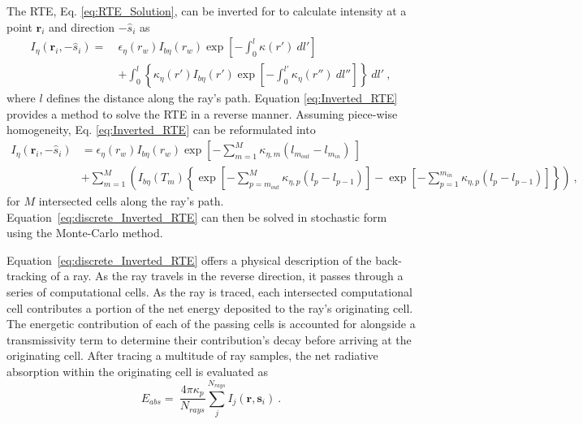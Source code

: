 The RTE, Eq. \ref{eq:RTE_Solution}, can be inverted for to calculate intensity at a point $\textbf{r}_i$ and direction $-\hat{s}_i$ as
\begin{equation}
    \begin{aligned}
    I_\eta{}(\textbf{r}_i,-\hat{s}_i) =~&\epsilon{}_\eta{}(r_w)I_{b\eta{}}(r_w)\exp{\left[-\int_0^l\kappa{}(r')~dl'\right]}\\
    &+\int_{0}^{l}{ \left\{ \kappa_\eta(r')I_{b\eta}(r')\exp{\left[-\int_0^{l'}\kappa_\eta(r'')~dl''\right]} \right\}}~dl'~,
    \label{eq:Inverted_RTE}
    \end{aligned}
\end{equation}
where $l$ defines the distance along the ray's path. Equation \ref{eq:Inverted_RTE} provides a method to solve the RTE in a reverse manner.
Assuming piece-wise homogeneity, Eq. \ref{eq:Inverted_RTE} can be reformulated into
\begin{equation}
    \begin{aligned}
    I_\eta{}(\textbf{r}_i,-\hat{s}_i)& = \epsilon{}_\eta{}(r_w)I_{b\eta{}}(r_w)\exp{\left[-\sum_{m=1}^M\kappa{}_{\eta{},m}(l_{m_{out}}-l_{m_{in}})~\right]}\\
    &+\sum_{m=1}^M\left( I_{b\eta}(T_m)\left\{ \exp{\left[-\sum_{p=m_{out}}^M\kappa{}_{\eta{},p}(l_{p}-l_{p-1})\right]}- \exp{\left[-\sum_{p=1}^{m_{in}}\kappa{}_{\eta{},p}(l_{p}-l_{p-1})\right]} \right\} \right)~,
    \label{eq:discrete_Inverted_RTE}
    \end{aligned}
\end{equation}
for $M$ intersected cells along the ray's path. Equation~\ref{eq:discrete_Inverted_RTE} can then be solved in stochastic form using the Monte-Carlo method.

Equation~\ref{eq:discrete_Inverted_RTE} offers a physical description of the back-tracking of a ray.
As the ray travels in the reverse direction, it passes through a series of computational cells. 
As the ray is traced, each intersected computational cell contributes a portion of the net energy deposited to the ray's originating cell. The energetic contribution of each of the passing cells is accounted for alongside a transmissivity term to determine their contribution's decay before arriving at the originating cell.
After tracing a multitude of ray samples, the net radiative absorption within the originating cell is evaluated as
\begin{equation}
    E_{abs}=~\frac{4\pi{}\kappa_p}{N_{rays}}\sum_j^{N_{rays}}I_j(\textbf{r},\textbf{s}_i)~.
    \label{eq:RayEnergies}
\end{equation}

